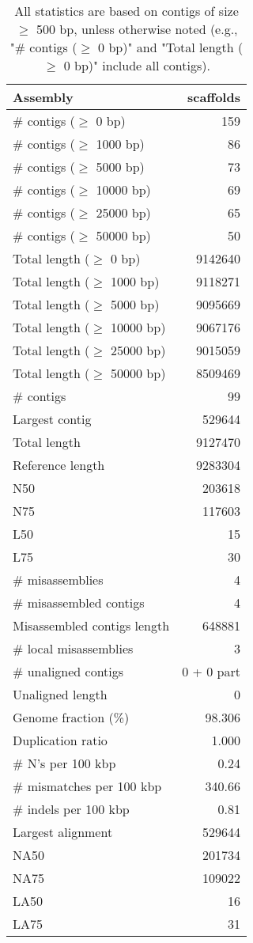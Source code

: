 \documentclass[12pt,a4paper]{article}
\begin{document}
\begin{table}[ht]
\begin{center}
\caption{All statistics are based on contigs of size $\geq$ 500 bp, unless otherwise noted (e.g., "\# contigs ($\geq$ 0 bp)" and "Total length ($\geq$ 0 bp)" include all contigs).}
\begin{tabular}{|l*{1}{|r}|}
\hline
Assembly & scaffolds \\ \hline
\# contigs ($\geq$ 0 bp) & 159 \\ \hline
\# contigs ($\geq$ 1000 bp) & 86 \\ \hline
\# contigs ($\geq$ 5000 bp) & 73 \\ \hline
\# contigs ($\geq$ 10000 bp) & 69 \\ \hline
\# contigs ($\geq$ 25000 bp) & 65 \\ \hline
\# contigs ($\geq$ 50000 bp) & 50 \\ \hline
Total length ($\geq$ 0 bp) & 9142640 \\ \hline
Total length ($\geq$ 1000 bp) & 9118271 \\ \hline
Total length ($\geq$ 5000 bp) & 9095669 \\ \hline
Total length ($\geq$ 10000 bp) & 9067176 \\ \hline
Total length ($\geq$ 25000 bp) & 9015059 \\ \hline
Total length ($\geq$ 50000 bp) & 8509469 \\ \hline
\# contigs & 99 \\ \hline
Largest contig & 529644 \\ \hline
Total length & 9127470 \\ \hline
Reference length & 9283304 \\ \hline
N50 & 203618 \\ \hline
N75 & 117603 \\ \hline
L50 & 15 \\ \hline
L75 & 30 \\ \hline
\# misassemblies & 4 \\ \hline
\# misassembled contigs & 4 \\ \hline
Misassembled contigs length & 648881 \\ \hline
\# local misassemblies & 3 \\ \hline
\# unaligned contigs & 0 + 0 part \\ \hline
Unaligned length & 0 \\ \hline
Genome fraction (\%) & 98.306 \\ \hline
Duplication ratio & 1.000 \\ \hline
\# N's per 100 kbp & 0.24 \\ \hline
\# mismatches per 100 kbp & 340.66 \\ \hline
\# indels per 100 kbp & 0.81 \\ \hline
Largest alignment & 529644 \\ \hline
NA50 & 201734 \\ \hline
NA75 & 109022 \\ \hline
LA50 & 16 \\ \hline
LA75 & 31 \\ \hline
\end{tabular}
\end{center}
\end{table}
\end{document}
